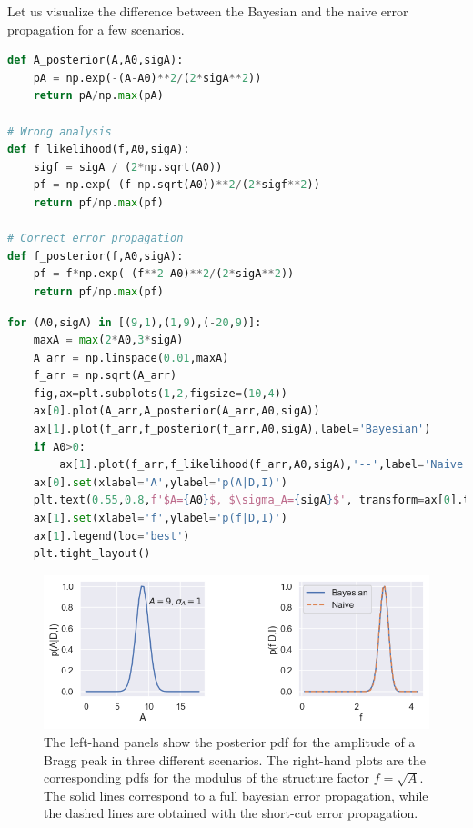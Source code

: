 \documentclass[%
oneside,                 %
final,                   %
10pt]{article}
\begin{document}
Let us visualize the difference between the Bayesian and the naive error propagation for a few scenarios.

\begin{lstlisting}[language=Python,style=blue1]
def A_posterior(A,A0,sigA):
    pA = np.exp(-(A-A0)**2/(2*sigA**2))
    return pA/np.max(pA)

# Wrong analysis
def f_likelihood(f,A0,sigA):
    sigf = sigA / (2*np.sqrt(A0))
    pf = np.exp(-(f-np.sqrt(A0))**2/(2*sigf**2))
    return pf/np.max(pf)

# Correct error propagation
def f_posterior(f,A0,sigA):
    pf = f*np.exp(-(f**2-A0)**2/(2*sigA**2))
    return pf/np.max(pf)
\end{lstlisting}

\begin{lstlisting}[language=Python,style=blue1]
for (A0,sigA) in [(9,1),(1,9),(-20,9)]:
    maxA = max(2*A0,3*sigA)
    A_arr = np.linspace(0.01,maxA)
    f_arr = np.sqrt(A_arr)
    fig,ax=plt.subplots(1,2,figsize=(10,4))
    ax[0].plot(A_arr,A_posterior(A_arr,A0,sigA))
    ax[1].plot(f_arr,f_posterior(f_arr,A0,sigA),label='Bayesian')
    if A0>0:
        ax[1].plot(f_arr,f_likelihood(f_arr,A0,sigA),'--',label='Naive')
    ax[0].set(xlabel='A',ylabel='p(A|D,I)')
    plt.text(0.55,0.8,f'$A={A0}$, $\sigma_A={sigA}$', transform=ax[0].transAxes,fontsize=16)
    ax[1].set(xlabel='f',ylabel='p(f|D,I)')
    ax[1].legend(loc='best')
    plt.tight_layout()
\end{lstlisting}


\begin{figure}[!ht]  %
  \centerline{\includegraphics[width=0.7\linewidth]{fig/error_square_root_9_1.png}}
  \caption{
  The left-hand panels show the posterior pdf for the amplitude of a Bragg peak in three different scenarios. The right-hand plots are the corresponding pdfs for the modulus of the structure factor $f=\sqrt{A}$. The solid lines correspond to a full bayesian error propagation, while the dashed lines are obtained with the short-cut error propagation.
  }
\end{figure}
\end{document}
